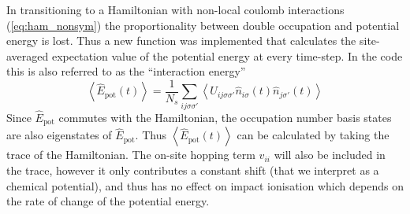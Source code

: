 In transitioning to a Hamiltonian with non-local coulomb interactions (\ref{eq:ham_nonsym}) the proportionality between double occupation and potential energy is lost. Thus a new function was implemented that calculates the site-averaged expectation value of the potential energy at every time-step. In the code this is also referred to as the ``interaction energy''
\begin{equation}
    \left\langle{\hat{E}_{\text{pot}}(t)}\right\rangle = \frac{1}{N_s} \sum_{ij\sigma\sigma'} \left\langle{U_{ij\sigma\sigma'}\hat{n}_{i \sigma}(t) \hat{n}_{j\sigma'}(t)}\right\rangle
\end{equation}
\color{red}
Since $\hat{E}_{\text{pot}}$ commutes with the Hamiltonian, the occupation number basis states are also eigenstates of $\hat{E}_{\text{pot}}$. Thus $\left\langle{\hat{E}_{\text{pot}}(t)}\right\rangle$ can be calculated by taking the trace of the Hamiltonian. The on-site hopping term $v_{ii}$ will also be included in the trace, however it only contributes a constant shift (that we interpret as a chemical potential), and thus has no effect on impact ionisation which depends on the rate of change of the potential energy.
\color{black}

